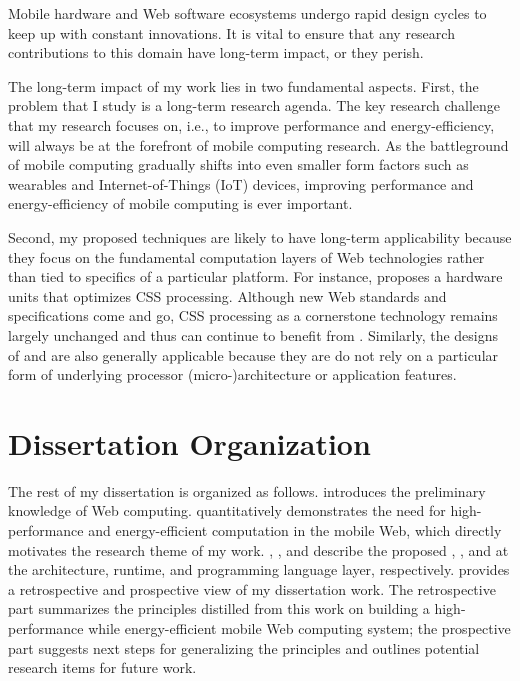Mobile hardware and Web software ecosystems undergo rapid design cycles to keep up with constant innovations. It is vital to ensure that any research contributions to this domain have long-term impact, or they perish.

The long-term impact of my work lies in two fundamental aspects. First, the problem that I study is a long-term research agenda. The key research challenge that my research focuses on, i.e., to improve performance and energy-efficiency, will always be at the forefront of mobile computing research. As the battleground of mobile computing gradually shifts into even smaller form factors such as wearables and Internet-of-Things (IoT) devices, improving performance and energy-efficiency of mobile computing is ever important.

Second, my proposed techniques are likely to have long-term applicability because they focus on the fundamental computation layers of Web technologies rather than tied to specifics of a particular platform. For instance, \webcore proposes a hardware units that optimizes CSS processing. Although new Web standards and specifications come and go, CSS processing as a cornerstone technology remains largely unchanged and thus can continue to benefit from \webcore. Similarly, the designs of \webrt and \greenweb are also generally applicable because they are do not rely on a particular form of underlying processor (micro-)architecture or application features.

\section{Dissertation Organization}
\label{sec:intro:outline}

The rest of my dissertation is organized as follows.  introduces the preliminary knowledge of Web computing.  quantitatively demonstrates the need for high-performance and energy-efficient computation in the mobile Web, which directly motivates the research theme of my work. , , and  describe the proposed \webcore, \webrt, and \greenweb at the architecture, runtime, and programming language layer, respectively.  provides a retrospective and prospective view of my dissertation work. The retrospective part summarizes the principles distilled from this work on building a high-performance while energy-efficient mobile Web computing system; the prospective part suggests next steps for generalizing the principles and outlines potential research items for future work.

